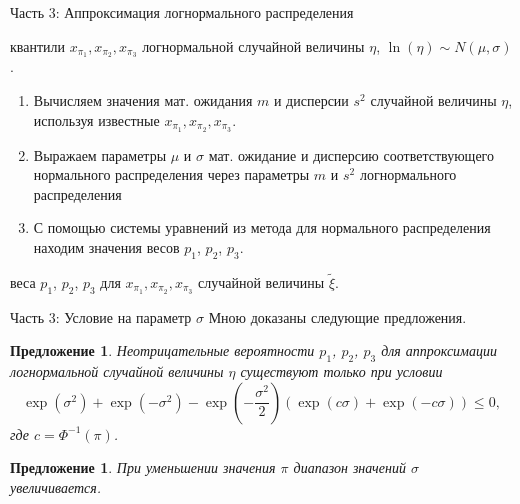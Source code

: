 \documentclass[ucs, notheorems, handout]{beamer}
\newtheorem{proposition2}[theorem]{Предложение}
\newenvironment{pr1}{\par\noindent{\bf Дано:}}{}
\newenvironment{pr3}{\par\noindent{\bf Результат:}}{}
\begin{document}
	\begin{frame}{Часть 3: Аппроксимация логнормального распределения}
		\begin{pr1}
			квантили $x_{\pi_{1}}, x_{\pi_{2}}, x_{\pi_{3}}$ логнормальной случайной величины $\eta$, $\ln(\eta) \sim N(\mu, \sigma)$.
		\end{pr1}
		
		\bigskip
		
		\begin{enumerate}
			\item Вычисляем значения мат. ожидания $m$ и дисперсии $s^{2}$ случайной величины $\eta$, используя известные $x_{\pi_{1}}, x_{\pi_{2}}, x_{\pi_{3}}$.
			\item Выражаем параметры $\mu$ и $\sigma$ мат. ожидание и дисперсию соответствующего нормального распределения через параметры $m$ и $s^{2}$ логнормального распределения
			\item С помощью системы уравнений из метода для нормального распределения находим значения весов $p_{1}$, $p_{2}$, $p_{3}$.
		\end{enumerate}
		\bigskip
		\begin{pr3}\end{pr3} веса $p_{1}$, $p_{2}$, $p_{3}$ для $x_{\pi_{1}}, x_{\pi_{2}}, x_{\pi_{3}}$ случайной величины $\tilde{\xi}$.
		
	\end{frame}
	
	\begin{frame}{Часть 3: Условие на параметр $\sigma$}
		Мною доказаны следующие предложения.
		\begin{proposition2}
			Неотрицательные вероятности $p_{1}$, $p_{2}$, $p_{3}$ для аппроксимации логнормальной случайной величины $\eta$ существуют только при условии \[\exp(\sigma^{2})+\exp(-\sigma^{2})-\exp\left( -\dfrac{\sigma^{2}}{2}\right) 
			(\exp(c\sigma)+\exp(-c\sigma))\leq 0,\] 
			где $c = \Phi^{-1}(\pi)$.
		\end{proposition2}
		
		\begin{proposition2}
			При уменьшении значения $\pi$ диапазон значений $\sigma$ увеличивается.
		\end{proposition2}
	
		
	\end{frame}
	
\end{document}
